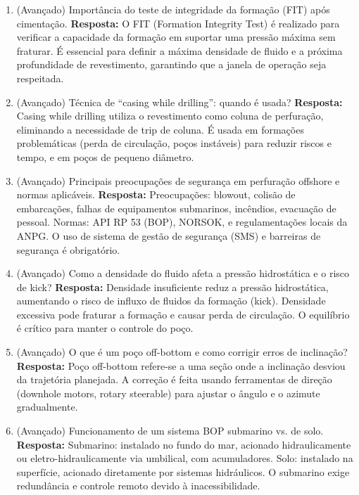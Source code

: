 \documentclass[11pt,a4paper]{article}
\begin{document}
\begin{enumerate}
  \item (Avançado) Importância do teste de integridade da formação (FIT) após cimentação.
  \textbf{Resposta:} O FIT (Formation Integrity Test) é realizado para verificar a capacidade da formação em suportar uma pressão máxima sem fraturar. É essencial para definir a máxima densidade de fluido e a próxima profundidade de revestimento, garantindo que a janela de operação seja respeitada.

  \item (Avançado) Técnica de ``casing while drilling'': quando é usada?
  \textbf{Resposta:} Casing while drilling utiliza o revestimento como coluna de perfuração, eliminando a necessidade de trip de coluna. É usada em formações problemáticas (perda de circulação, poços instáveis) para reduzir riscos e tempo, e em poços de pequeno diâmetro.

  \item (Avançado) Principais preocupações de segurança em perfuração offshore e normas aplicáveis.
  \textbf{Resposta:} Preocupações: blowout, colisão de embarcações, falhas de equipamentos submarinos, incêndios, evacuação de pessoal. Normas: API RP 53 (BOP), NORSOK, e regulamentações locais da ANPG. O uso de sistema de gestão de segurança (SMS) e barreiras de segurança é obrigatório.

  \item (Avançado) Como a densidade do fluido afeta a pressão hidrostática e o risco de kick?
  \textbf{Resposta:} Densidade insuficiente reduz a pressão hidrostática, aumentando o risco de influxo de fluidos da formação (kick). Densidade excessiva pode fraturar a formação e causar perda de circulação. O equilíbrio é crítico para manter o controle do poço.

  \item (Avançado) O que é um poço off-bottom e como corrigir erros de inclinação?
  \textbf{Resposta:} Poço off-bottom refere-se a uma seção onde a inclinação desviou da trajetória planejada. A correção é feita usando ferramentas de direção (downhole motors, rotary steerable) para ajustar o ângulo e o azimute gradualmente.

  \item (Avançado) Funcionamento de um sistema BOP submarino vs. de solo.
  \textbf{Resposta:} Submarino: instalado no fundo do mar, acionado hidraulicamente ou eletro-hidraulicamente via umbilical, com acumuladores. Solo: instalado na superfície, acionado diretamente por sistemas hidráulicos. O submarino exige redundância e controle remoto devido à inacessibilidade.


\end{enumerate}
\end{document}
